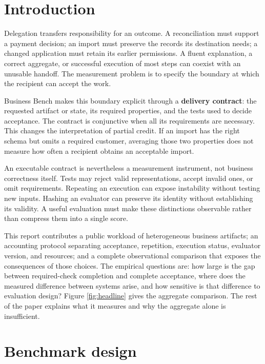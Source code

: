 \section{Introduction}\label{sec:1}

Delegation transfers responsibility for an outcome. A reconciliation must support a payment decision; an import must preserve the records its destination needs; a changed application must retain its earlier permissions. A fluent explanation, a correct aggregate, or successful execution of most steps can coexist with an unusable handoff. The measurement problem is to specify the boundary at which the recipient can accept the work.

Business Bench makes this boundary explicit through a \textbf{delivery contract}: the requested artifact or state, its required properties, and the tests used to decide acceptance. The contract is conjunctive when all its requirements are necessary. This changes the interpretation of partial credit. If an import has the right schema but omits a required customer, averaging those two properties does not measure how often a recipient obtains an acceptable import.

An executable contract is nevertheless a measurement instrument, not business correctness itself. Tests may reject valid representations, accept invalid ones, or omit requirements. Repeating an execution can expose instability without testing new inputs. Hashing an evaluator can preserve its identity without establishing its validity. A useful evaluation must make these distinctions observable rather than compress them into a single score.

This report contributes a public workload of heterogeneous business artifacts; an accounting protocol separating acceptance, repetition, execution status, evaluator version, and resources; and a complete observational comparison that exposes the consequences of those choices. The empirical questions are: how large is the gap between required-check completion and complete acceptance, where does the measured difference between systems arise, and how sensitive is that difference to evaluation design? Figure \ref{fig:headline} gives the aggregate comparison. The rest of the paper explains what it measures and why the aggregate alone is insufficient.

\section{Benchmark design}\label{sec:2}

